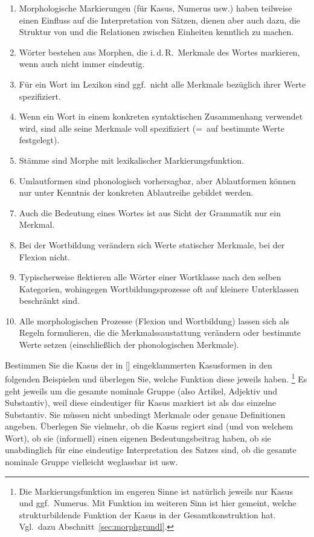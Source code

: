 \Zusammenfassung

\begin{enumerate}\Lf
  \item Morphologische Markierungen (\zB für Kasus, Numerus usw.) haben teilweise einen Einfluss auf die Interpretation von Sätzen, dienen aber auch dazu, die Struktur von und die Relationen zwischen Einheiten kenntlich zu machen.
  \item Wörter bestehen aus Morphen, die i.\,d.\,R.\ Merkmale des Wortes markieren, wenn auch nicht immer eindeutig.
  \item Für ein Wort im Lexikon sind ggf.\ nicht alle Merkmale bezüglich ihrer Werte spezifiziert.
  \item Wenn ein Wort in einem konkreten syntaktischen Zusammenhang verwendet wird, sind alle seine Merkmale voll spezifiziert (=~auf bestimmte Werte festgelegt).
  \item Stämme sind Morphe mit lexikalischer Markierungsfunktion.
  \item Umlautformen sind phonologisch vorhersagbar, aber Ablautformen können nur unter Kenntnis der konkreten Ablautreihe gebildet werden.
  \item Auch die Bedeutung eines Wortes ist aus Sicht der Grammatik nur ein Merkmal.
  \item Bei der Wortbildung verändern sich Werte statischer Merkmale, bei der Flexion nicht.
  \item Typischerweise flektieren alle Wörter einer Wortklasse nach den selben Kategorien, wohingegen Wortbildungsprozesse oft auf kleinere Unterklassen beschränkt sind.
  \item Alle morphologischen Prozesse (Flexion und Wortbildung) lassen sich als Regeln formulieren, die die Merkmalssaustattung verändern oder bestimmte Werte setzen (einschließlich der phonologischen Merkmale).
\end{enumerate}

\Uebungen

\Uebung[\tristar] \label{u61} Bestimmen Sie die Kasus der in [] eingeklammerten Kasusformen in den folgenden Beispielen und überlegen Sie, welche Funktion diese jeweils haben.%
\footnote{Die Markierungsfunktion im engeren Sinne ist natürlich jeweils nur Kasus und ggf.\ Numerus.
Mit Funktion im weiteren Sinn ist hier gemeint, welche strukturbildende Funktion der Kasus in der Gesamtkonstruktion hat.
Vgl.\ dazu Abschnitt~\ref{sec:morphgrundl}.}
Es geht jeweils um die gesamte nominale Gruppe (also Artikel, Adjektiv und Substantiv), weil diese eindeutiger für Kasus markiert ist als das einzelne Substantiv.
Sie müssen nicht unbedingt Merkmale oder genaue Definitionen angeben.
Überlegen Sie vielmehr, ob die Kasus regiert sind (und von welchem Wort), ob sie (informell) einen eigenen Bedeutungsbeitrag haben, ob sie unabdinglich für eine eindeutige Interpretation des Satzes sind, ob die gesamte nominale Gruppe vielleicht weglassbar ist usw.

